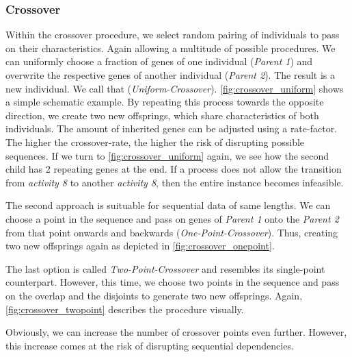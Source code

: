 \documentclass[./../../paper.tex]{subfiles}
\begin{document}
\subsubsection{Crossover}
Within the crossover procedure, we select random pairing of individuals to pass on their characteristics. Again allowing a multitude of possible procedures. We can uniformly choose a fraction of genes of one individual (\emph{Parent 1}) and overwrite the respective genes of another individual (\emph{Parent 2}). The result is a new individual. We call that (\emph{Uniform-Crossover}). \autoref{fig:crossover_uniform} shows a simple schematic example. By repeating this process towards the opposite direction, we create two new offsprings, which share characteristics of both individuals. The amount of inherited genes can be adjusted using a rate-factor. The higher the crossover-rate, the higher the risk of disrupting possible sequences. If we turn to \autoref{fig:crossover_uniform} again, we see how the second child has 2 repeating genes at the end. If a process does not allow the transition from \emph{activity 8} to another \emph{activity 8}, then the entire \gls{instance} becomes infeasible.



The second approach is suituable for sequential data of same lengths. We can choose a point in the sequence and pass on genes of \emph{Parent 1} onto the \emph{Parent 2} from that point onwards and  backwards (\emph{One-Point-Crossover}). Thus, creating two new offsprings again as depicted in \autoref{fig:crossover_onepoint}. 



The last option is called \emph{Two-Point-Crossover} and resembles its single-point counterpart. However, this time, we choose two points in the sequence and pass on the overlap and the disjoints to generate two new offsprings. Again, \autoref{fig:crossover_twopoint} describes the procedure visually.

Obviously, we can increase the number of crossover points even further. However, this increase comes at the risk of disrupting sequential dependencies. 





\end{document}
